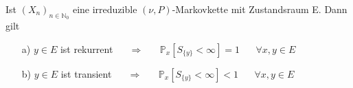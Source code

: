 \label{irreduzibel, y rekurrent -> Px=1 , y transient -> Px<1 }
Ist $(X_{n})_{n \in \mathbb{N}_{0}}$ eine irreduzible $(\nu,P)$-Markovkette mit Zustandsraum E. Dann gilt
\begin{itemize}
\item[a)]$y \in E$ ist rekurrent $\quad$ $\Rightarrow$ $\quad$ $\mathbb{P}_{x}[S_{\lbrace y \rbrace} < \infty] = 1$ $\quad$ $\forall x,y \in E$ 
\item[b)]$y \in E$ ist transient $\quad$ $\Rightarrow$ $\quad$ $\mathbb{P}_{x}[S_{\lbrace y \rbrace} < \infty] < 1$ $\quad$ $\forall x,y \in E$  
\end{itemize}